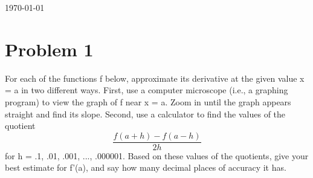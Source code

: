 \documentclass[12pt,en,a4paper]{article}
\begin{document}
\begin{titlepage}
\begin{center}
\begin{minipage}{0.4\textwidth}
\begin{flushright}
				\end{flushright}
			\end{minipage}
			
			\vfill
			
			\vspace{2cm}
			{\large \today}
		\end{center}
	\end{titlepage}
	
	\section*{Problem 1}
	For each of the functions f below, approximate its derivative at the given value x = a in two different ways. First, use a computer microscope (i.e., a graphing program) to view the graph of f near x = a. Zoom in until the graph appears straight and find its slope. Second, use a calculator to find the values of the quotient
	\[ 
	\frac{f(a+h)-f(a-h)}{2h}
	\]
	for h = .1, .01, .001, ..., .000001. Based on these values of the quotients, give your best estimate for f'(a), and say how many decimal places of accuracy it has.\par
\end{document}
